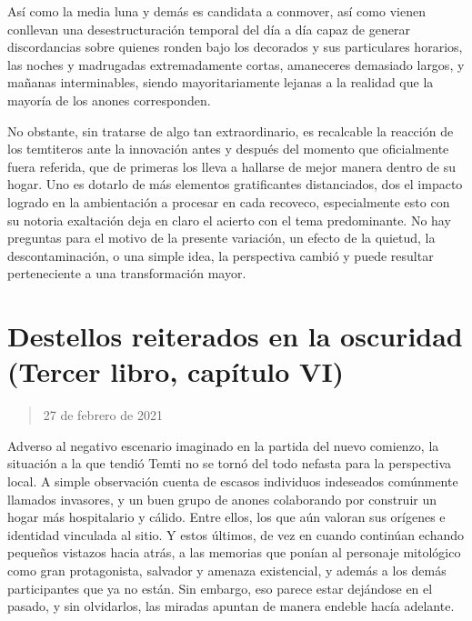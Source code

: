 \documentclass[
]{book}
\begin{document}
Así como la media luna y demás es candidata a conmover, así como vienen conllevan una desestructuración temporal del día a día capaz de generar discordancias sobre quienes ronden bajo los decorados y sus particulares horarios, las noches y madrugadas extremadamente cortas, amaneceres demasiado largos, y mañanas interminables, siendo mayoritariamente lejanas a la realidad que la mayoría de los anones corresponden.

No obstante, sin tratarse de algo tan extraordinario, es recalcable la reacción de los temtiteros ante la innovación antes y después del momento que oficialmente fuera referida, que de primeras los lleva a hallarse de mejor manera dentro de su hogar. Uno es dotarlo de más elementos gratificantes distanciados, dos el impacto logrado en la ambientación a procesar en cada recoveco, especialmente esto con su notoria exaltación deja en claro el acierto con el tema predominante. No hay preguntas para el motivo de la presente variación, un efecto de la quietud, la descontaminación, o una simple idea, la perspectiva cambió y puede resultar perteneciente a una transformación mayor.

\hypertarget{destellos-reiterados-en-la-oscuridad-tercer-libro-capuxedtulo-vi}{%
\section{Destellos reiterados en la oscuridad (Tercer libro, capítulo VI)}\label{destellos-reiterados-en-la-oscuridad-tercer-libro-capuxedtulo-vi}}

\begin{quote}
27 de febrero de 2021
\end{quote}

Adverso al negativo escenario imaginado en la partida del nuevo comienzo, la situación a la que tendió Temti no se tornó del todo nefasta para la perspectiva local. A simple observación cuenta de escasos individuos indeseados comúnmente llamados invasores, y un buen grupo de anones colaborando por construir un hogar más hospitalario y cálido. Entre ellos, los que aún valoran sus orígenes e identidad vinculada al sitio. Y estos últimos, de vez en cuando continúan echando pequeños vistazos hacia atrás, a las memorias que ponían al personaje mitológico como gran protagonista, salvador y amenaza existencial, y además a los demás participantes que ya no están. Sin embargo, eso parece estar dejándose en el pasado, y sin olvidarlos, las miradas apuntan de manera endeble hacía adelante.
\end{document}

